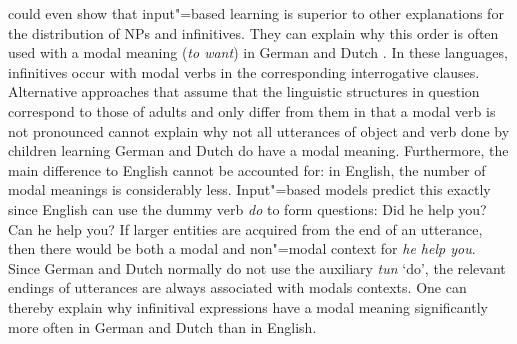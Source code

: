 \citet*{FPG2009a} could even show that input"=based learning is superior to other explanations for the distribution of
NPs and infinitives. They can explain why this order is often used with a modal meaning (\eg \emph{to want})
in German and Dutch \citep{IT96a}. 
In these languages, infinitives occur with modal verbs in the corresponding interrogative clauses. Alternative approaches that
assume that the linguistic structures in question correspond to those of adults and only differ from them in that a modal verb
is not pronounced cannot explain why not all utterances of object and verb done by children learning German and Dutch do have a modal meaning.
Furthermore, the main difference to English cannot be accounted for: in English, the number of modal meanings is considerably
less. Input"=based models predict this exactly since English can use the dummy verb \emph{do} to form questions:
\eal
\ex Did he help you?
\ex Can he help you?
\zl
If larger entities are acquired from the end of an utterance, then there would be both a modal and non"=modal
context for \emph{he help you}. Since German and Dutch normally do not use the auxiliary \emph{tun} `do', 
the relevant endings of utterances are always associated with modals contexts.  One can thereby explain
why infinitival expressions have a modal meaning significantly more often in German and Dutch than in English. 

